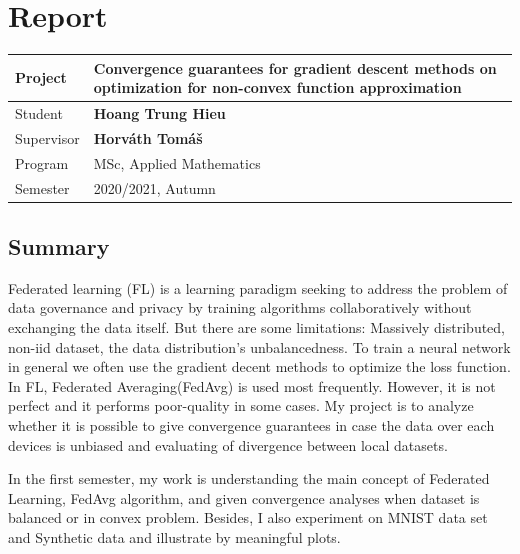 \documentclass{article}
\theoremstyle{theorem}
\theoremstyle{definition}
\begin{document}
	\section*{Report}
	
		\begin{tabular}{ | m{7em} | m{6.5cm}|  }  
			\hline
			Project & \textbf{Convergence guarantees for gradient descent methods on optimization for non-convex function approximation} \\
			\hline
			Student & \textbf{Hoang Trung Hieu}\\
			\hline 
			Supervisor & \textbf{Horváth Tomáš} \\
			\hline
			 Program & MSc, Applied Mathematics \\
			\hline			
			Semester & 2020/2021, Autumn \\
			\hline
		\end{tabular}
	\subsection*{Summary}
	 Federated learning (FL) is a learning paradigm seeking to address the problem of data governance and privacy by training algorithms collaboratively without exchanging the data itself. But there are some limitations: Massively distributed, non-iid dataset, the data distribution's unbalancedness. To train a neural network in general we often use the gradient decent methods to optimize the loss function. In FL, Federated Averaging(FedAvg) is used most frequently. However, it is not perfect and it performs poor-quality in some cases. My project is to analyze whether it is possible to give convergence guarantees in case the data over each devices is unbiased and evaluating of divergence between local datasets.
	
	In the first semester, my work is understanding the main concept of Federated Learning, FedAvg algorithm, and  given convergence analyses when dataset is balanced or in convex problem. Besides, I also experiment on MNIST data set and Synthetic data and illustrate by meaningful plots.	
\end{document}
